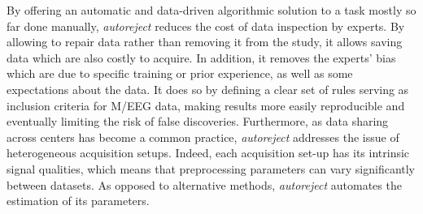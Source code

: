 By offering an automatic and data-driven algorithmic solution to a task mostly so far done manually, \emph{autoreject} reduces the cost of data inspection by experts. By allowing to repair data rather than removing it from the study, it allows saving data which are also costly to acquire. In addition, it removes the experts' bias which are due to specific training or prior experience, as well as some expectations about the data. It does so by defining a clear set of rules serving as inclusion criteria for M/EEG data, making results more easily reproducible and eventually limiting the risk of false discoveries. Furthermore, as data sharing across centers has become a common practice, \emph{autoreject}  addresses the issue of heterogeneous acquisition setups. Indeed, each acquisition set-up has its intrinsic signal qualities, which means that preprocessing parameters can vary significantly between datasets. As opposed to alternative methods, \emph{autoreject} automates the estimation of its parameters.
